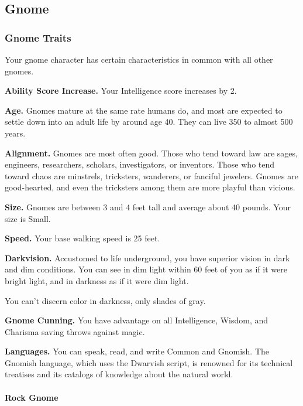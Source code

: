 \documentclass[
]{article}
\begin{document}
\hypertarget{gnome}{%
\subsection{Gnome}\label{gnome}}

\hypertarget{gnome-traits}{%
\subsubsection{Gnome Traits}\label{gnome-traits}}

Your gnome character has certain characteristics in common with all
other gnomes.

\textbf{Ability Score Increase.} Your Intelligence score increases by 2.

\textbf{Age.} Gnomes mature at the same rate humans do, and most are
expected to settle down into an adult life by around age 40. They can
live 350 to almost 500 years.

\textbf{Alignment.} Gnomes are most often good. Those who tend toward
law are sages, engineers, researchers, scholars, investigators, or
inventors. Those who tend toward chaos are minstrels, tricksters,
wanderers, or fanciful jewelers. Gnomes are good-hearted, and even the
tricksters among them are more playful than vicious.

\textbf{Size.} Gnomes are between 3 and 4 feet tall and average about 40
pounds. Your size is Small.

\textbf{Speed.} Your base walking speed is 25 feet.

\textbf{Darkvision.} Accustomed to life underground, you have superior
vision in dark and dim conditions. You can see in dim light within 60
feet of you as if it were bright light, and in darkness as if it were
dim light.

You can't discern color in darkness, only shades of gray.

\textbf{Gnome Cunning.} You have advantage on all Intelligence, Wisdom,
and Charisma saving throws against magic.

\textbf{Languages.} You can speak, read, and write Common and Gnomish.
The Gnomish language, which uses the Dwarvish script, is renowned for
its technical treatises and its catalogs of knowledge about the natural
world.

\hypertarget{rock-gnome}{%
\paragraph{Rock Gnome}\label{rock-gnome}}
\end{document}
